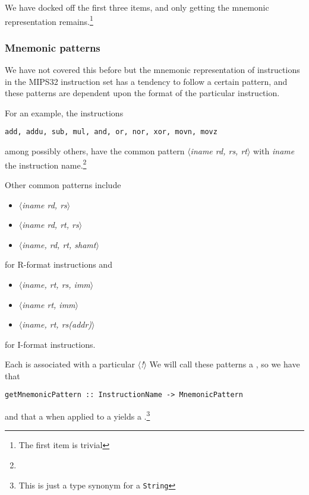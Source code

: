 We have docked off the first three items, and only getting the
mnemonic representation remains.\footnote{The first item is trivial}

\subsubsection{Mnemonic patterns}

We have not covered this before but the mnemonic representation of
instructions in the MIPS32 instruction set has a tendency to follow
a certain pattern, and these patterns are dependent upon the format of
the particular instruction.

For an example, the instructions

\begin{verbatim}
add, addu, sub, mul, and, or, nor, xor, movn, movz
\end{verbatim}

among possibly others, have the common pattern \emph{$\langle$iname
rd, rs, rt$\rangle$} with
\emph{iname} the instruction name.\footnote{\inamem}

\newcommand{\pattern}[1]{\emph{$\langle$#1$\rangle$}}

Other common patterns include 

\begin{itemize}
\item \pattern{iname rd, rs}
\item \pattern{iname rd, rt, rs}
\item \pattern{iname, rd, rt, shamt}
\end{itemize}

for R-format instructions and

\begin{itemize}
\item \pattern{iname, rt, rs, imm}
\item \pattern{iname rt, imm}
\item \pattern{iname, rt, rs(addr)}
\end{itemize}

for I-format instructions.

Each \inamem is associated with a particular \pattern! We will call
these patterns a , so we have that

\begin{verbatim}
getMnemonicPattern :: InstructionName -> MnemonicPattern
\end{verbatim}

and that a  when applied to a \decomposedm
yields a .\footnote{This is just a type synonym for a \texttt{String}}

